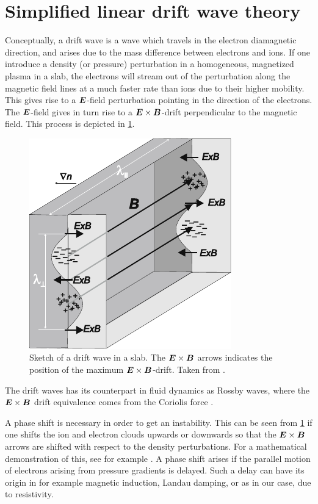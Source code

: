 \section{Simplified linear drift wave theory}
\label{sec:simpleLin}
%
Conceptually, a drift wave is a wave which travels in the electron diamagnetic direction, and arises due to the mass difference between electrons and ions.
If one introduce a density (or pressure) perturbation in a homogeneous, magnetized plasma in a slab, the  electrons will stream out of the perturbation along the magnetic field lines at a much faster rate than ions due to their higher mobility.
This gives rise to a $\boldsymbol{E}$-field perturbation pointing in the direction of the electrons.
The $\boldsymbol{E}$-field gives in turn rise to a $\boldsymbol{E}\times\boldsymbol{B}$-drift perpendicular to the magnetic field.
This process is depicted in \cref{fig:DW}.
%
\begin{figure}[htb]
    \centering
    \includegraphics{fig/driftwave}
    \caption{
        Sketch of a drift wave in a slab.
        The $\boldsymbol{E}\times\boldsymbol{B}$ arrows indicates the position of the maximum $\boldsymbol{E}\times\boldsymbol{B}$-drift.
        Taken from \cite{Stroth2011book}.
    }
    \label{fig:DW}
\end{figure}
%
The drift waves has its counterpart in fluid dynamics as Rossby waves, where the $\boldsymbol{E}\times\boldsymbol{B}$ drift equivalence comes from the Coriolis force \cite{Shepherd1987}.

A phase shift is necessary in order to get an instability.
This can be seen from \cref{fig:DW} if one shifts the ion and electron clouds upwards or downwards so that the $\boldsymbol{E}\times\boldsymbol{B}$ arrows are shifted with respect to the density perturbations.
For a mathematical demonstration of this, see for example \cite{Garcia2001a}.
A phase shift arises if the parallel motion of electrons arising from pressure gradients is delayed.
Such a delay can have its origin in for example magnetic induction, Landau damping, or as in our case, due to resistivity.

